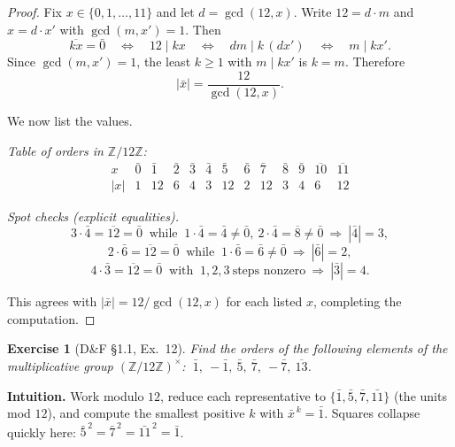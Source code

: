\documentclass[12pt]{article}
\newtheorem{exercise}[theorem]{Exercise}
\theoremstyle{definition}
\begin{document}
\begin{proof}
Fix $x\in\{0,1,\dots,11\}$ and let $d=\gcd(12,x)$. Write $12=d\cdot m$ and $x=d\cdot x'$ with $\gcd(m,x')=1$.
Then
\[
\overline{kx}=\bar 0
\quad\Longleftrightarrow\quad
12\mid kx
\quad\Longleftrightarrow\quad
dm\mid k\,(d x')
\quad\Longleftrightarrow\quad
m\mid kx'.
\]
Since $\gcd(m,x')=1$, the least $k\ge 1$ with $m\mid kx'$ is $k=m$. Therefore
\[
\lvert\bar x\rvert=\frac{12}{\gcd(12,x)}.
\]

We now list the values.

\dotfill

\noindent
\emph{Table of orders in $\mathbb{Z}/12\mathbb{Z}$:}
\[
\begin{array}{c|cccccccccccc}
x & \bar{0} & \bar{1} & \bar{2} & \bar{3} & \bar{4} & \bar{5} & \bar{6} & \bar{7} & \bar{8} & \bar{9} & \overline{10} & \overline{11} \\
\hline
|x| & 1 & 12 & 6 & 4 & 3 & 12 & 2 & 12 & 3 & 4 & 6 & 12
\end{array}
\]

\dotfill

\noindent
\emph{Spot checks (explicit equalities).}
\[
3\cdot\bar{4}=\overline{12}=\bar 0\ \text{ while }\
1\cdot\bar{4}=\bar{4}\neq\bar 0,\ 2\cdot\bar{4}=\overline{8}\neq\bar 0\ \Rightarrow\ |\bar{4}|=3,
\]
\[
2\cdot\bar{6}=\overline{12}=\bar 0\ \text{ while }\
1\cdot\bar{6}=\bar{6}\neq\bar 0\ \Rightarrow\ |\bar{6}|=2,
\]
\[
4\cdot\bar{3}=\overline{12}=\bar 0\ \text{ with }\
1,2,3\ \text{steps nonzero}\ \Rightarrow\ |\bar{3}|=4.
\]

This agrees with $\lvert\bar x\rvert=12/\gcd(12,x)$ for each listed $x$, completing the computation.
\end{proof}

\newpage

\begin{exercise}[D\&F §1.1, Ex.~12]
Find the orders of the following elements of the multiplicative group $(\mathbb{Z}/12\mathbb{Z})^{\times}$:
$\ \bar 1,\ -\bar 1,\ \bar 5,\ \bar 7,\ -\bar 7,\ \overline{13}$.
\end{exercise}

\dotfill

\noindent
\textbf{Intuition.}
Work modulo $12$, reduce each representative to $\{\bar 1,\bar 5,\bar 7,\bar{11}\}$ (the units mod $12$), and compute the smallest
positive $k$ with $\bar x^{\,k}=\bar 1$. Squares collapse quickly here: $\bar5^{\,2}=\bar7^{\,2}=\bar{11}^{\,2}=\bar1$.
\end{document}
